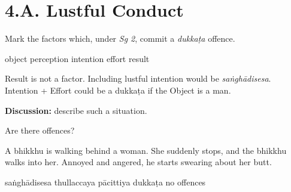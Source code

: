 \chapter{4.A. Lustful Conduct}
\renewcommand*{\theChapterTitle}{4.A. Lustful Conduct}

\begin{exam}{\autoExamName}

\begin{problem*}

  \begin{parts}

  \item Mark the factors which, under \textit{Sg 2}, commit a \textit{dukkaṭa} offence.

    \bigskip

    \begin{answers}{6}
      \bChoices
       object\eAns
       perception\eAns
       intention\eAns
       effort\eAns
       result\eAns
      \eChoices
    \end{answers}

    \bigskip

    \begin{solution}
      Result is not a factor.
      Including lustful intention would be \emph{saṅghādisesa}.
      Intention + Effort could be a dukkaṭa if the Object is a man.
    \end{solution}

    \textbf{Discussion:} describe such a situation.

  \end{parts}

\end{problem*}

\problemDivide

\begin{problem*}

  Are there offences?

  \begin{parts}

  \item
    A bhikkhu is walking behind a woman. She suddenly stops, and the bhikkhu walks
    into her. Annoyed and angered, he starts swearing about her butt.

    \bigskip

    \begin{answers}{5}
      \bChoices
       saṅghādisesa\eAns
       thullaccaya\eAns
       pācittiya\eAns
       dukkaṭa\eAns
       no offences\eAns
      \eChoices
    \end{answers}


\end{parts}
\end{problem*}
\end{exam}
